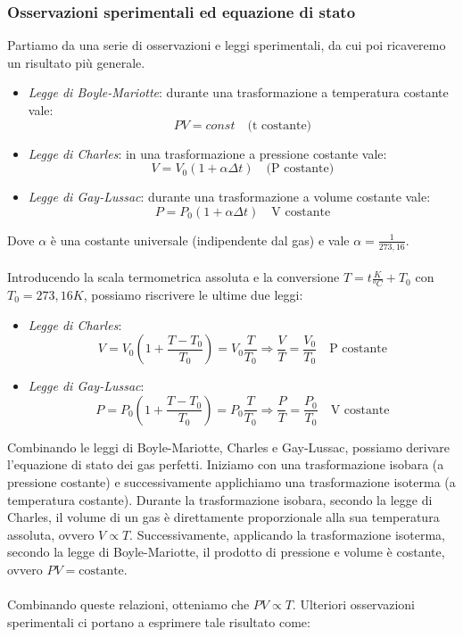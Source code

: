 \documentclass{article}
\begin{document}
\subsubsection{Osservazioni sperimentali ed equazione di stato}
Partiamo da una serie di osservazioni e leggi sperimentali, da cui poi ricaveremo un risultato più generale.
\begin{itemize}
    \item \textit{Legge di Boyle-Mariotte}: durante una trasformazione a temperatura costante vale: $$ PV = const \quad\text{(t costante)} $$
    \item \textit{Legge di Charles}: in una trasformazione a pressione costante vale:
    $$ V=V_0(1+\alpha\Delta t) \quad\text{(P costante)} $$
    \item \textit{Legge di Gay-Lussac}: durante una trasformazione a volume costante vale:
    $$ P=P_0(1+\alpha\Delta t)\quad \text{V costante} $$    
\end{itemize}
Dove $\alpha$ è una costante universale (indipendente dal gas) e vale $\alpha = \frac{1}{273,16}$.\\\\
Introducendo la scala termometrica assoluta e la conversione $T=t\frac{K}{^oC}+T_0$ con $T_0=273,16K$, possiamo riscrivere le ultime due leggi:
\begin{itemize}
    \item \textit{Legge di Charles}:
    $$ V=V_0(1+\frac{T-T_0}{T_0})=V_0\frac{T}{T_0} \Rightarrow \frac{V}{T}=\frac{V_0}{T_0}\quad\text{P costante}$$

    \item \textit{Legge di Gay-Lussac}:
    $$ P=P_0(1+\frac{T-T_0}{T_0})=P_0\frac{T}{T_0}\Rightarrow\frac{P}{T}=\frac{P_0}{T_0}\quad\text{V costante} $$
\end{itemize}
Combinando le leggi di Boyle-Mariotte, Charles e Gay-Lussac, possiamo derivare l'equazione di stato dei gas perfetti. Iniziamo con una trasformazione isobara (a pressione costante) e successivamente applichiamo una trasformazione isoterma (a temperatura costante). Durante la trasformazione isobara, secondo la legge di Charles, il volume di un gas è direttamente proporzionale alla sua temperatura assoluta, ovvero $ V \propto T $. Successivamente, applicando la trasformazione isoterma, secondo la legge di Boyle-Mariotte, il prodotto di pressione e volume è costante, ovvero $ PV = \text{costante} $.\\\\
Combinando queste relazioni, otteniamo che $ PV \propto T $. Ulteriori osservazioni sperimentali ci portano a esprimere tale risultato come:
\end{document}

